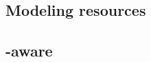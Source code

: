 

\subsection{Modeling \texorpdfstring{}{INP} resources}


\subsection{\texorpdfstring{}{INP}-aware \texorpdfstring{}{Resource Managers}} \label{inp_aware_rms}

